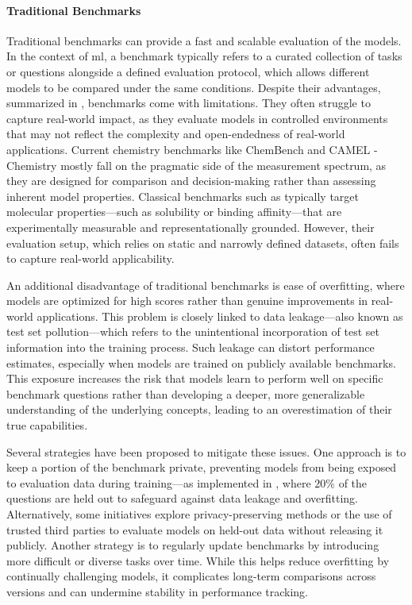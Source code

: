 \paragraph{Traditional Benchmarks}\label{para:trad_benchmarks}
Traditional benchmarks can provide a fast and scalable evaluation of the models. In the context of \gls{ml}, a benchmark typically refers to a curated collection of tasks or questions alongside a defined evaluation protocol, which allows different models to be compared under the same conditions. 
Despite their advantages, summarized in , benchmarks come with  limitations. They often struggle to capture real-world impact, as they evaluate models in controlled environments that may not reflect the complexity and open-endedness of real-world applications. Current chemistry benchmarks like ChemBench\autocite{mirza2024large} and CAMEL - Chemistry\autocite{li2023camel} mostly fall on the pragmatic side of the measurement spectrum, as they are designed for comparison and decision-making rather than assessing inherent model properties. 
Classical benchmarks such as  \autocite{wu2018moleculenet} typically target molecular properties---such as solubility or binding affinity---that are experimentally measurable and representationally grounded. However, their evaluation setup, which relies on static and narrowly defined datasets, often fails to capture real-world applicability.

An additional disadvantage of traditional benchmarks is ease of overfitting, where models are optimized for high scores rather than genuine improvements in real-world applications. 
This problem is closely linked to data leakage---also known as test set pollution---which refers to the unintentional incorporation of test set information into the training process. Such leakage can distort performance estimates, especially when models are trained on publicly available benchmarks.\autocite{thompson2025chatbots}
This exposure increases the risk that models learn to perform well on specific benchmark questions rather than developing a deeper, more generalizable understanding of the underlying concepts, leading to an overestimation of their true capabilities. 

Several strategies have been proposed to mitigate these issues. One approach is to keep a portion of the benchmark private, preventing models from being exposed to evaluation data during training---as implemented in , where $20\%$ of the questions are held out to safeguard against data leakage and overfitting.\autocite{laurent2024lab0bench0} 
Alternatively, some initiatives explore privacy-preserving methods or the use of trusted third parties to evaluate models on held-out data without releasing it publicly. \autocite{eleutherai2024thirdparty}
Another strategy is to regularly update benchmarks by introducing more difficult or diverse tasks over time. \autocite{jimenez2023swe} 
While this helps reduce overfitting by continually challenging models, it complicates long-term comparisons across versions and can undermine stability in performance tracking. \autocite{alampara2025lessons}


